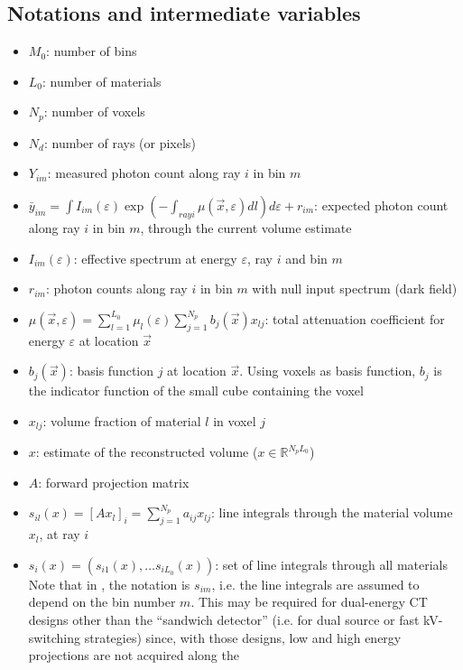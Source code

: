 \documentclass[a4paper, 10pt]{article}
\begin{document}
\subsection{Notations and intermediate variables}
\begin{itemize}
 \item $M_0$: number of bins
 \item $L_0$: number of materials
 \item $N_p$: number of voxels
 \item $N_d$: number of rays (or pixels)
 \item $Y_{im}$: measured photon count along ray $i$ in bin $m$
 \item $\bar{y}_{im} = \int I_{im}(\varepsilon) \exp \left( - \int_{ray i} \mu(\vec{x}, \varepsilon) dl \right) d\varepsilon + r_{im}$: expected photon count along ray $i$ in bin $m$, through the current volume estimate
 \item $I_{im}(\varepsilon)$: effective spectrum at energy $\varepsilon$, ray $i$ and bin $m$
 \item $r_{im}$: photon counts along ray $i$ in bin $m$ with null input spectrum (dark field)
 \item $\mu(\vec{x}, \varepsilon) = \sum_{l=1}^{L_0} \mu_l(\varepsilon) \sum_{j=1}^{N_p} b_j(\vec{x})x_{lj}$: total attenuation coefficient for energy $\varepsilon$ at location $\vec{x}$
 \item $b_j(\vec{x})$: basis function $j$ at location $\vec{x}$. Using voxels as basis function, $b_j$ is the indicator function of the small cube containing the voxel
 \item $x_{lj}$: volume fraction of material $l$ in voxel $j$
 \item $x$: estimate of the reconstructed volume ($x \in \mathbb{R}^{N_p L_0}$)
 \item $A$: forward projection matrix
 \item $s_{il}(x) = [A x_l]_i = \sum_{j=1}^{N_p} a_{ij}x_{lj}$: line integrals through the material volume $x_l$, at ray $i$
 \item $s_i(x) = \left( s_{i1}(x), \hdots s_{iL_0}(x) \right)$: set of line integrals through all materials
 Note that in \cite{long_multi-material_2014}, the notation is $s_{im}$, i.e. the line integrals are assumed to depend on the bin number $m$. This may be required for dual-energy CT designs
 other than the ``sandwich detector'' (i.e. for dual source or fast kV-switching strategies) since, with those designs, low and high energy projections are not acquired along the 

\end{itemize}
\end{document}
